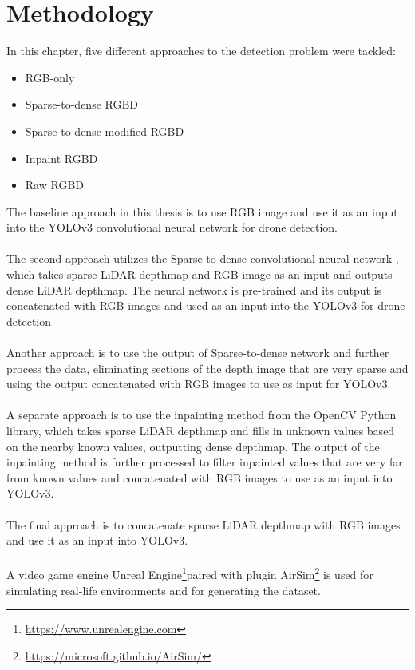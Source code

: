 \documentclass[twoside]{ctuthesis}
\theoremstyle{plain}
\theoremstyle{definition}
\theoremstyle{note}
\begin{document}
\chapter{Methodology}
In this chapter, five different approaches to the detection problem were tackled:
\begin{itemize}
	\item RGB-only
	\item Sparse-to-dense RGBD
	\item Sparse-to-dense modified RGBD
	\item Inpaint RGBD
	\item Raw RGBD
\end{itemize}
The baseline approach in this thesis is to use RGB image and use it as an input into the YOLOv3 \cite{redmon2018yolov3} convolutional neural network for drone detection.\\
\\
The second approach utilizes the Sparse-to-dense convolutional neural network \cite{ma2018sparsetodense}, which takes sparse LiDAR depthmap and RGB image as an input and outputs dense LiDAR depthmap. The neural network is pre-trained and its output is concatenated with RGB images and used as an input into the YOLOv3  for drone detection\\
\\
Another approach is to use the output of Sparse-to-dense network and further process the data, eliminating sections of the depth image that are very sparse and using the output concatenated with RGB images to use as input for YOLOv3.\\
\\
A separate approach is to use the inpainting method from the OpenCV Python library, which takes sparse LiDAR depthmap and fills in unknown values based on the nearby known values, outputting dense depthmap. The output of the inpainting method is further processed to filter inpainted values that are very far from known values and concatenated with RGB images to use as an input into YOLOv3.\\
\\
The final approach is to concatenate sparse LiDAR depthmap with RGB images and use it as an input into YOLOv3.\\
\\
A video game engine Unreal Engine\footnote{\url{https://www.unrealengine.com}}paired with plugin AirSim\footnote{\url{https://microsoft.github.io/AirSim/}} is used for simulating real-life environments and for generating the dataset.
\end{document}
